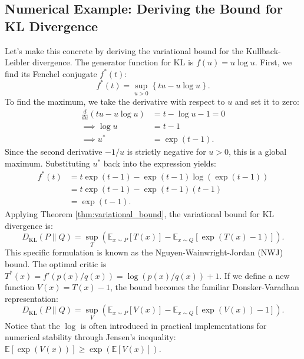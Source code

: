 \subsection{Numerical Example: Deriving the Bound for KL Divergence}
Let's make this concrete by deriving the variational bound for the Kullback-Leibler divergence.
The generator function for KL is $f(u) = u \log u$.
First, we find its Fenchel conjugate $f^*(t)$:
\begin{equation}
    f^*(t) = \sup_{u > 0} \left\{ tu - u \log u \right\}.
\end{equation}
To find the maximum, we take the derivative with respect to $u$ and set it to zero:
\begin{align*}
    \frac{d}{du} (tu - u \log u) &= t - \log u - 1 = 0 \\
    \implies \log u &= t - 1 \\
    \implies u^* &= \exp(t - 1).
\end{align*}
Since the second derivative $-1/u$ is strictly negative for $u>0$, this is a global maximum. Substituting $u^*$ back into the expression yields:
\begin{align*}
    f^*(t) &= t \exp(t-1) - \exp(t-1) \log(\exp(t-1)) \\
           &= t \exp(t-1) - \exp(t-1)(t-1) \\
           &= \exp(t-1).
\end{align*}
Applying Theorem \ref{thm:variational_bound}, the variational bound for KL divergence is:
\begin{equation}
    D_{\text{KL}}(P \parallel Q) = \sup_{T} \left( \mathbb{E}_{x \sim P}[T(x)] - \mathbb{E}_{x \sim Q}[\exp(T(x) - 1)] \right).
\end{equation}
This specific formulation is known as the Nguyen-Wainwright-Jordan (NWJ) bound. 
The optimal critic is $T^*(x) = f'(p(x)/q(x)) = \log(p(x)/q(x)) + 1$. 
If we define a new function $V(x) = T(x) - 1$, the bound becomes the familiar Donsker-Varadhan representation:
\begin{equation}
    D_{\text{KL}}(P \parallel Q) = \sup_{V} \left( \mathbb{E}_{x \sim P}[V(x)] - \mathbb{E}_{x \sim Q}[\exp(V(x)) - 1] \right).
\end{equation}
Notice that the $\log$ is often introduced in practical implementations for numerical stability through Jensen's inequality: $\mathbb{E}[\exp(V(x))] \ge \exp(\mathbb{E}[V(x)])$.

